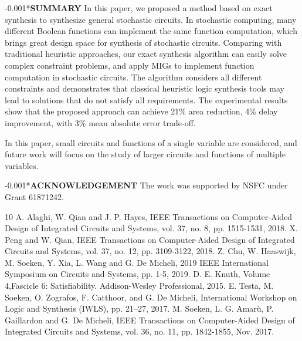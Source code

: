 \documentclass[conference,letterpaper]{IEEEtran}
\makeatletter
\renewcommand{\section}{\@startsection{section}{1}{0mm}
    {-\baselineskip}{0.001\baselineskip}{\bf\leftline}}
\makeatother
\begin{document}
\section*{\textbf{\large SUMMARY}}
In this paper, we proposed a method based on  exact synthesis to synthesize general stochastic circuits. In stochastic computing, many different Boolean functions can implement the same function computation, which brings great design space for synthesis of stochastic circuits. Comparing with traditional heuristic approaches, our exact synthesis algorithm can easily solve complex constraint problems, and apply MIGs to implement function computation in stochastic circuits. The algorithm considers all different constraints and demonstrates that classical heuristic logic synthesis tools may lead to solutions that do not satisfy all requirements. The experimental results show that the proposed approach can achieve 21\% area reduction, 4\% delay improvement, with 3\% mean absolute error trade-off.\vspace{-3ex}

In this paper, small circuits and functions of a single variable are considered, and future work will focus on the study of larger circuits and functions of multiple variables.



\section*{\textbf{\large ACKNOWLEDGEMENT}} \vspace{-3ex}
The work was supported by NSFC under Grant 61871242.

\small
\begin{thebibliography}{10}
A. Alaghi, W. Qian and J. P. Hayes, IEEE Transactions on Computer-Aided Design of Integrated Circuits and Systems, vol. 37, no. 8, pp. 1515-1531, 2018.
X. Peng and W. Qian, IEEE Transactions on Computer-Aided Design of Integrated Circuits and Systems, vol. 37, no. 12, pp. 3109-3122, 2018.
Z. Chu, W. Haaswijk, M. Soeken, Y. Xia, L. Wang and G. De Micheli, 2019 IEEE International Symposium on Circuits and Systems, pp. 1-5,  2019.
D. E. Knuth, Volume 4,Fascicle 6: Satisfiability. Addison-Wesley Professional, 2015.
E. Testa, M. Soeken, O. Zografos, F. Catthoor, and G. De Micheli,  International Workshop on Logic and Synthesis (IWLS), pp. 21–27, 2017.
M. Soeken, L. G. Amarù, P. Gaillardon and G. De Micheli, IEEE Transactions on Computer-Aided Design of Integrated Circuits and Systems, vol. 36, no. 11, pp. 1842-1855, Nov. 2017.
\end{thebibliography}

\enlargethispage{-6.5cm}
%
\end{document}
